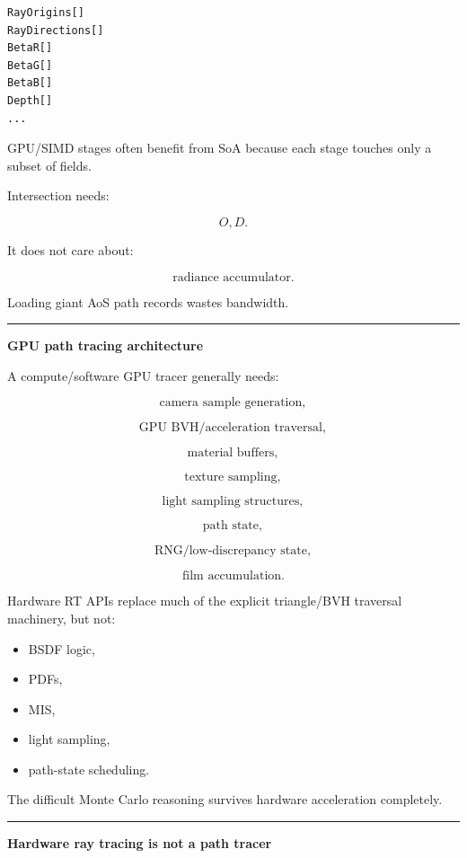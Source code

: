 \begin{verbatim}
RayOrigins[]
RayDirections[]
BetaR[]
BetaG[]
BetaB[]
Depth[]
...
\end{verbatim}

GPU/SIMD stages often benefit from SoA because each stage touches only a subset of fields.

Intersection needs:

\[
O,D.
\]

It does not care about:

\[
\text{radiance accumulator}.
\]

Loading giant AoS path records wastes bandwidth.

\begin{center}\rule{0.5\linewidth}{0.5pt}\end{center}

\textbf{GPU path tracing architecture}

A compute/software GPU tracer generally needs:

\[
\text{camera sample generation},
\]

\[
\text{GPU BVH/acceleration traversal},
\]

\[
\text{material buffers},
\]

\[
\text{texture sampling},
\]

\[
\text{light sampling structures},
\]

\[
\text{path state},
\]

\[
\text{RNG/low-discrepancy state},
\]

\[
\text{film accumulation}.
\]

Hardware RT APIs replace much of the explicit triangle/BVH traversal machinery, but not:

\begin{itemize}
\tightlist
\item
  BSDF logic,
\item
  PDFs,
\item
  MIS,
\item
  light sampling,
\item
  path-state scheduling.
\end{itemize}

The difficult Monte Carlo reasoning survives hardware acceleration completely.

\begin{center}\rule{0.5\linewidth}{0.5pt}\end{center}

\textbf{Hardware ray tracing is not a path tracer}


